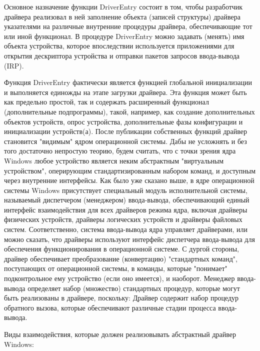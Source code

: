 \documentclass[14pt,a4paper]{article}
\begin{document}
\par Основное назначение функции DriverEntry состоит в том, чтобы разработчик драйвера реализовал в ней заполнение объекта (записей структуры) драйвера указателями на различные внутренние процедуры драйвера, обеспечивающие тот или иной функционал. В процедуре DriverEntry можно задавать (менять) имя объекта устройства, которое впоследствии используется приложениями для открытия дескриптора устройства и отправки пакетов запросов ввода-вывода (IRP).\\

\par Функция DriverEntry фактически является функцией глобальной инициализации и выполняется единожды на этапе загрузки драйвера. Эта функция может быть как предельно простой, так и содержать расширенный функционал (дополнительные подпрограммы), такой, например, как создание дополнительных объектов устройств, опрос устройства, дополнительные фазы конфигурации и инициализации устройств(а).
После публикации собственных функций драйвер становится "видимым" ядром операционной системы. Дабы не усложнять и без того достаточно непростую теорию, будем считать, что с точки зрения ядра Windows любое устройство является неким абстрактным "виртуальным устройством", оперирующим стандартизированным набором команд, и доступным через внутренние интерфейсы. Как было уже сказано выше, в ядре операционной системы Windows присутствует специальный модуль исполнительной системы, называемый диспетчером (менеджером) ввода-вывода, обеспечивающий единый интерфейс взаимодействия для всех драйверов режима ядра, включая драйверы физических устройств, драйверы логических устройств и драйверы файловых систем. Соответственно, система ввода-вывода ядра управляет драйверами, или можно сказать, что драйверы используют интерфейс диспетчера ввода-вывода для обеспечения функционирования в операционной системе. С дургой стороны, драйвер обеспечивает преобразование (конвертацию) "стандартных команд", поступающих от операционной системы, в команды, которые "понимает" подконтрольное ему устройство (если оно имеется), и наоборот. Менеджер ввода-вывода определяет набор (множество) стандартных процедур, которые могут быть реализованы в драйвере, поскольку: Драйвер содержит набор процедур обратного вызова, которые обеспечивают различные стадии процесса ввода-вывода.\\

\par Виды взаимодействия, которые должен реализовывать абстрактный драйвер Windows:
\end{document}
